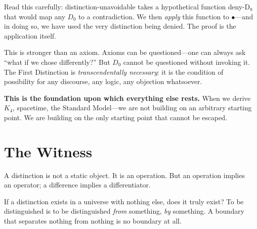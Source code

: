 \documentclass[11pt,a4paper]{book}
\def\texttt#1{#1}%
\begin{document}
Read this carefully: \texttt{distinction-unavoidable} takes a hypothetical 
function \texttt{deny-D₀} that would map any $D_0$ to a contradiction. We then 
\emph{apply} this function to $\bullet$---and in doing so, we have used the 
very distinction being denied. The proof is the application itself.

\begin{center}
\end{center}

This is stronger than an axiom. Axioms can be questioned---one can always ask 
``what if we chose differently?'' But $D_0$ cannot be questioned without invoking 
it. The First Distinction is \emph{transcendentally necessary}: it is the 
condition of possibility for any discourse, any logic, any objection whatsoever.

\textbf{This is the foundation upon which everything else rests.} When we derive 
$K_4$, spacetime, the Standard Model---we are not building on an arbitrary 
starting point. We are building on the only starting point that cannot be escaped.

\chapter{The Witness}

A distinction is not a static object. It is an operation. But an operation 
implies an operator; a difference implies a differentiator.

If a distinction exists in a universe with nothing else, does it truly exist? 
To be distinguished is to be distinguished \emph{from} something, \emph{by} 
something. A boundary that separates nothing from nothing is no boundary at all.
\end{document}
